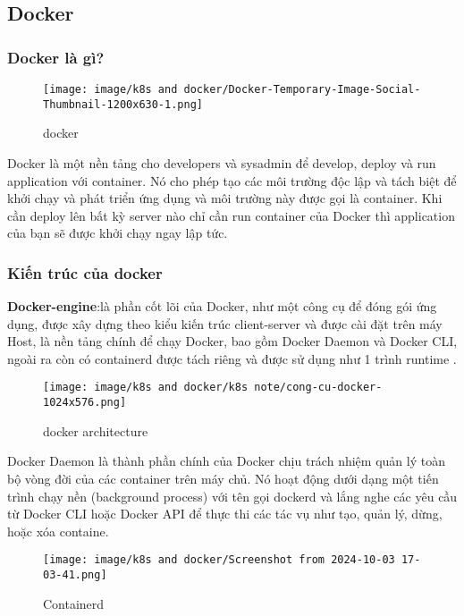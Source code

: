 \documentclass[a4paper,12pt]{article}
\begin{document}
\subsection{Docker}
\subsubsection{ Docker là gì?}
\begin{figure}[htbp]
    \centering
    \texttt{[image: image/k8s and docker/Docker-Temporary-Image-Social-Thumbnail-1200x630-1.png]}
    \caption{docker}
    \label{}
\end{figure}
Docker là một nền tảng cho developers và sysadmin để develop, deploy và run application với container. Nó cho phép tạo các môi trường độc lập và tách biệt để khởi chạy và phát triển ứng dụng và môi trường này được gọi là container. Khi cần deploy lên bất kỳ server nào chỉ cần run container của Docker thì application của bạn sẽ được khởi chạy ngay lập tức.



\subsubsection{Kiến trúc của docker}
\textbf{Docker-engine}:là phần cốt lõi của Docker, như một công cụ để đóng gói ứng dụng, được xây dựng theo kiểu kiến trúc client-server và được cài đặt trên máy Host, là nền tảng chính để chạy Docker, bao gồm Docker Daemon và Docker CLI, ngoài ra còn có containerd được tách riêng và được sử dụng như 1 trình runtime .\\


\begin{figure}[htbp]
    \centering
    \texttt{[image: image/k8s and docker/k8s note/cong-cu-docker-1024x576.png]}
    \caption{docker architecture }
    \label{}
\end{figure}



Docker Daemon là thành phần chính của Docker chịu trách nhiệm quản lý toàn bộ vòng đời của các container trên máy chủ. Nó hoạt động dưới dạng một tiến trình chạy nền (background process) với tên gọi dockerd và lắng nghe các yêu cầu từ Docker CLI hoặc Docker API để thực thi các tác vụ như tạo, quản lý, dừng, hoặc xóa containe. \\


\begin{figure}[htbp]
    \centering
    \texttt{[image: image/k8s and docker/Screenshot from 2024-10-03 17-03-41.png]}
    \caption{Containerd}
    \label{}
\end{figure}
\end{document}
